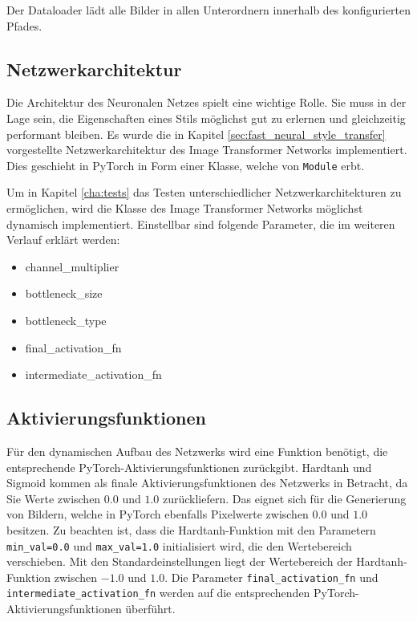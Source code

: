 Der Dataloader lädt alle Bilder in allen Unterordnern innerhalb des konfigurierten Pfades.

\subsection{Netzwerkarchitektur}
\label{sec:network_architecture}

Die Architektur des Neuronalen Netzes spielt eine wichtige Rolle. Sie muss in der Lage sein, die Eigenschaften eines Stils möglichst gut zu erlernen und gleichzeitig performant bleiben. Es wurde die in Kapitel \ref{sec:fast_neural_style_transfer} vorgestellte Netzwerkarchitektur des Image Transformer Networks implementiert. Dies geschieht in PyTorch in Form einer Klasse, welche von \texttt{Module} erbt.

Um in Kapitel \ref{cha:tests} das Testen unterschiedlicher Netzwerkarchitekturen zu ermöglichen, wird die Klasse des Image Transformer Networks möglichst dynamisch implementiert. Einstellbar sind folgende Parameter, die im weiteren Verlauf erklärt werden:

\begin{itemize}
    \item channel\_multiplier
    \item bottleneck\_size
    \item bottleneck\_type
    \item final\_activation\_fn
    \item intermediate\_activation\_fn
\end{itemize}

\subsection{Aktivierungsfunktionen}

Für den dynamischen Aufbau des Netzwerks wird eine Funktion benötigt, die entsprechende PyTorch-Aktivierungsfunktionen zurückgibt. Hardtanh und Sigmoid kommen als finale Aktivierungsfunktionen des Netzwerks in Betracht, da Sie Werte zwischen $ 0.0 $ und $ 1.0 $ zurückliefern. Das eignet sich für die Generierung von Bildern, welche in PyTorch ebenfalls Pixelwerte zwischen $ 0.0 $ und $ 1.0 $ besitzen. Zu beachten ist, dass die Hardtanh-Funktion mit den Parametern \texttt{min_val=0.0} und \texttt{max_val=1.0} initialisiert wird, die den Wertebereich verschieben. Mit den Standardeinstellungen liegt der Wertebereich der Hardtanh-Funktion zwischen $ -1.0 $ und $ 1.0 $. Die Parameter \texttt{final_activation_fn} und \texttt{intermediate_activation_fn} werden auf die entsprechenden PyTorch-Aktivierungsfunktionen überführt.

